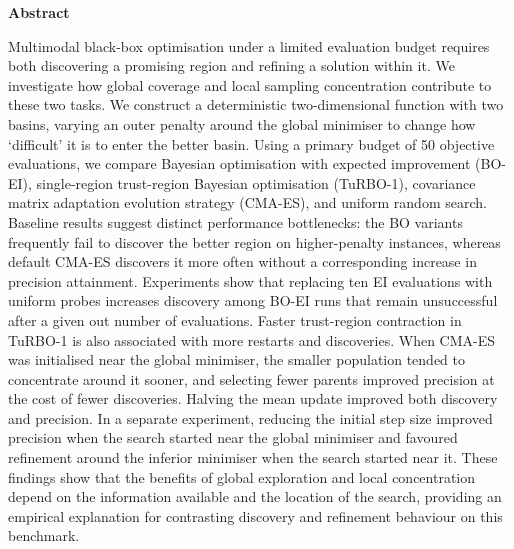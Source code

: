 \begin{center}\textbf{Abstract}\end{center}
\noindent
Multimodal black-box optimisation under a limited evaluation budget requires both discovering a promising region and refining a solution within it. We investigate how global coverage and local sampling concentration contribute to these two tasks. We construct a deterministic two-dimensional function with two basins, varying an outer penalty around the global minimiser to change how ‘difficult’ it is to enter the better basin. Using a primary budget of 50 objective evaluations, we compare Bayesian optimisation with expected improvement (BO-EI), single-region trust-region Bayesian optimisation (TuRBO-1), covariance matrix adaptation evolution strategy (CMA-ES), and uniform random search. Baseline results suggest distinct performance bottlenecks: the BO variants frequently fail to discover the better region on higher-penalty instances, whereas default CMA-ES discovers it more often without a corresponding increase in precision attainment. Experiments show that replacing ten EI evaluations with uniform probes increases discovery among BO-EI runs that remain unsuccessful after a given out number of evaluations. Faster trust-region contraction in TuRBO-1 is also associated with more restarts and discoveries. When CMA-ES was initialised near the global minimiser, the smaller
population tended to concentrate around it sooner, and selecting
fewer parents improved precision at the cost of fewer discoveries.
Halving the mean update improved both discovery and precision.
In a separate experiment, reducing the initial step size improved
precision when the search started near the global minimiser and
favoured refinement around the inferior minimiser when the search
started near it. These findings show that the benefits of global exploration and local concentration depend on the information available and the location of the search, providing an empirical explanation for contrasting discovery and refinement behaviour on this benchmark.